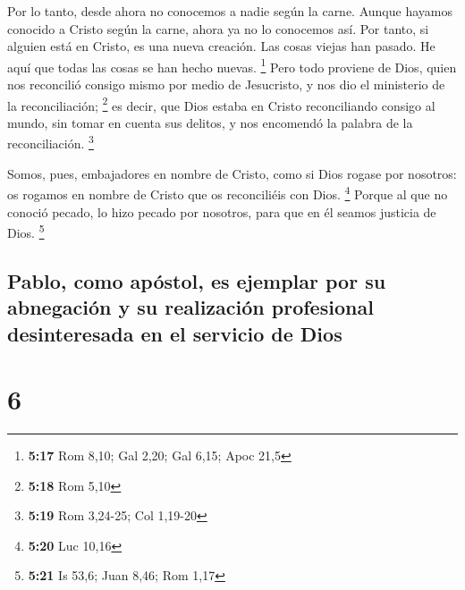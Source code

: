  Por lo tanto, desde ahora no conocemos a nadie según la
carne. Aunque hayamos conocido a Cristo según la carne, ahora ya no lo
conocemos así.  Por tanto, si alguien está en Cristo, es
una nueva creación. Las cosas viejas han pasado. He aquí que todas las
cosas se han hecho nuevas. \footnote{\textbf{5:17} Rom 8,10; Gal 2,20;
  Gal 6,15; Apoc 21,5}  Pero todo proviene de Dios, quien
nos reconcilió consigo mismo por medio de Jesucristo, y nos dio el
ministerio de la reconciliación; \footnote{\textbf{5:18} Rom 5,10}
 es decir, que Dios estaba en Cristo reconciliando
consigo al mundo, sin tomar en cuenta sus delitos, y nos encomendó la
palabra de la reconciliación. \footnote{\textbf{5:19} Rom 3,24-25; Col
  1,19-20}

 Somos, pues, embajadores en nombre de Cristo, como si
Dios rogase por nosotros: os rogamos en nombre de Cristo que os
reconciliéis con Dios. \footnote{\textbf{5:20} Luc 10,16}
 Porque al que no conoció pecado, lo hizo pecado por
nosotros, para que en él seamos justicia de Dios. \footnote{\textbf{5:21}
  Is 53,6; Juan 8,46; Rom 1,17}

\hypertarget{pablo-como-apuxf3stol-es-ejemplar-por-su-abnegaciuxf3n-y-su-realizaciuxf3n-profesional-desinteresada-en-el-servicio-de-dios}{%
\subsection{Pablo, como apóstol, es ejemplar por su abnegación y su
realización profesional desinteresada en el servicio de
Dios}\label{pablo-como-apuxf3stol-es-ejemplar-por-su-abnegaciuxf3n-y-su-realizaciuxf3n-profesional-desinteresada-en-el-servicio-de-dios}}

\hypertarget{section-5}{%
\section{6}\label{section-5}}


